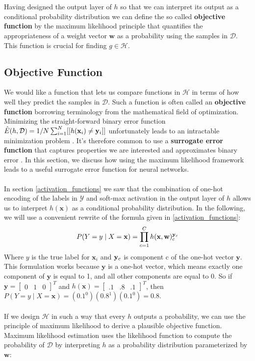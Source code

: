 \\\\
Having designed the output layer of $h$ so that we can interpret its output as a conditional probability distribution we can define the so called \textbf{objective function} by the maximum likelihood principle that quantifies the appropriateness of a weight vector $\mathbf{w}$ as a probability using the samples in $\mathcal{D}$. This function is crucial for finding $g \in \mathcal{H}$.

\subsection{Objective Function}
\label{objectiveFunction}
We would like a function that lets us compare functions in $\mathcal{H}$ in terms of how well they predict the samples in $\mathcal{D}$. Such a function is often called an \textbf{objective function} borrowing terminology from the mathematical field of optimization. Minimizing the straight-forward binary error function $\hat{E}(h, \mathcal{D}) = 1/N \sum_{i=1}^N[[h(\mathbf{x}_i) \neq \mathbf{y}_i]]$ unfortunately leads to an intractable minimization problem \citep{marcotte1992}. It's therefore common to use a \textbf{surrogate error function} that captures properties we are interested and approximates binary error \citep{goodfellow16}. In this section, we discuss how using the maximum likelihood framework leads to a useful surrogate error function for neural networks.
\\\\
In section \ref{activation_functions} we saw that the combination of one-hot encoding of the labels in $\mathcal{Y}$ and soft-max activation in the output layer of $h$ allows us to interpret $h(\mathbf{x})$ as a conditional probability distribution. In the following, we will use a convenient rewrite of the formula given in \ref{activation_functions}:
$$
P(Y = y \mid X = \mathbf{x}) = \prod\limits_{c=1}^C h(\mathbf{x},\mathbf{w})^{\mathbf{y}_c}_c
$$
Where $y$ is the true label for $\mathbf{x}_i$ and $\mathbf{y}_c$ is component c of the one-hot vector $\mathbf{y}$. 
This formulation works because $\mathbf{y}$ is a one-hot vector, which means exactly one component of $\mathbf{y}$ is equal to 1, and all other components are equal to 0. So if $\mathbf{y} = \begin{bmatrix}0 & 1 & 0 \end{bmatrix}^T$ and $h(\mathbf{x}) = \begin{bmatrix}.1 & .8 & .1 \end{bmatrix}^T$, then $P(Y = y \mid X = \mathbf{x}) = (0.1^0)(0.8^1)(0.1^0) = 0.8$.
\\\\
If we design $\mathcal{H}$ in such a way that every $h$ outputs a probability, we can use the principle of maximum likelihood to derive a plausible objective function. Maximum likelihood estimation uses the likelihood function to compute the probability of $\mathcal{D}$ by interpreting $h$ as a probability distribution parameterized by $\mathbf{w}$:

